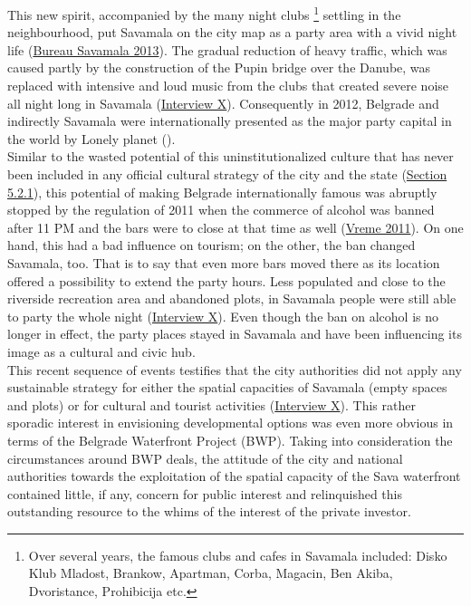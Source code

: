 \documentclass[11pt]{report}
\begin{document}
{{{{This new spirit, accompanied by the many night clubs
\footnote{Over several years, the famous clubs and cafes in Savamala included: Disko Klub Mladost, Brankow, Apartman, Corba, Magacin, Ben Akiba, Dvoristance, Prohibicija etc.}
settling in the neighbourhood,
put Savamala on the city map as a  party area with a vivid night life
(\href{Bureau Savamala}{Bureau Savamala 2013}).
The gradual reduction of heavy traffic, which was caused partly by the construction of the Pupin bridge over the Danube, was replaced with intensive and loud music from the clubs that created severe noise all night long in Savamala
(\href{InterviewX}{Interview X}).
Consequently in 2012, Belgrade and indirectly Savamala were internationally presented as the major party capital in the world by Lonely planet (\href{Lonely Planet}{\citealt{planet_ultimate_2012}}).
\\

Similar to the wasted potential of this uninstitutionalized culture that has never been included in any official cultural strategy of the city and the state (\href{Section 5.2.1}{Section 5.2.1}), this potential of making Belgrade internationally famous was abruptly stopped by the regulation of 2011 when the commerce of alcohol was banned after 11 PM and the bars were to close at that time as well (\href{Vreme}{Vreme 2011}). %
On one hand, this had a bad influence on tourism; on the other, the ban changed Savamala, too. That is to say that even more bars moved there as its location offered a possibility to extend the party hours. Less populated and close to the riverside recreation area and abandoned plots, in Savamala people were still able to party the whole night (\href{InterviewX}{Interview X}).
Even though the ban on alcohol is no longer in effect, the party places stayed in Savamala and have been influencing its image as a cultural and civic hub.
\\

This recent sequence of events testifies that the city authorities did not apply any sustainable strategy for either the spatial capacities of Savamala (empty spaces and plots) or for cultural and tourist activities  (\href{InterviewX}{Interview X}).
This rather sporadic interest in envisioning developmental options was even more obvious in terms of the Belgrade Waterfront Project (BWP). Taking into consideration the circumstances around BWP deals, the attitude of the city and national authorities towards the exploitation of the spatial capacity of the Sava waterfront contained little, if any, concern for public interest and relinquished this outstanding resource to the whims of the interest of the private investor.
\\

}}}}
\end{document}
